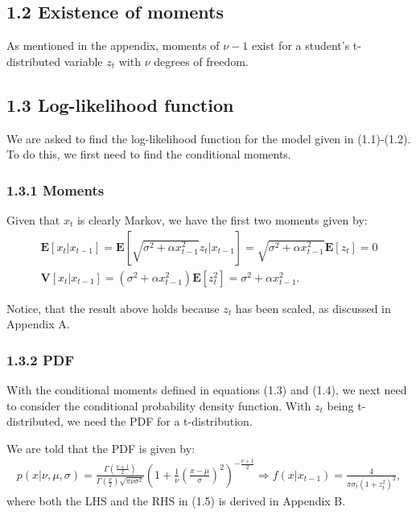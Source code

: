 \documentclass[11pt,a4paper,oneside]{article}
\newcommand{\lp}{\left(}
\newcommand{\rp}{\right)}
\newcommand{\rb}{\right]}
\newcommand{\lb}{\left[}
\newcommand{\ee}{\mathbf{E}}
\newcommand{\vv}{\mathbf{V}}
\begin{document}
\subsection{1.2 Existence of moments}
As mentioned in the appendix, moments of $\nu - 1$ exist for a student's t-distributed variable $z_t$ with $\nu$ degrees of freedom.

\subsection{1.3 Log-likelihood function}
We are asked to find the log-likelihood function for the model given in (1.1)-(1.2). To do this, we first need to find the conditional moments. 

\subsubsection{1.3.1 Moments}
Given that $x_t$ is clearly Markov, we have the first two moments given by:
\begin{gather}
    \ee\lb x_t\vert x_{t-1}\rb 
        = \ee\lb \sqrt{\sigma^2 + \alpha x_{t-1}^2} z_t\vert x_{t-1}\rb
        = \sqrt{\sigma^2 + \alpha x_{t-1}^2}\ee\lb z_t\rb = 0\\
    \vv\lb x_t\vert x_{t-1}\rb
        = \lp \sigma^2 + \alpha x_{t-1}^2\rp \ee\lb z_t^2\rb = \sigma^2 + \alpha x_{t-1}^2.
\end{gather}

Notice, that the result above holds because $z_t$ has been scaled, as discussed in Appendix A.

\subsubsection{1.3.2 PDF}
With the conditional moments defined in equations (1.3) and (1.4), we next need to consider the conditional probability density function. With $z_t$ being t-distributed, we need the PDF for a t-distribution. 

We are told that the PDF is given by:
\begin{align}
    p\lp x \vert \nu, \mu, \sigma\rp 
        = \frac{\Gamma\lp \frac{\nu + 1}{2}\rp}{\Gamma \lp \frac{\nu}{2}\rp \sqrt{\pi\nu\sigma^2}}\lp 1 + \frac{1}{\nu}\lp \frac{x - \mu}{\sigma}\rp^2\rp^{-\frac{\nu + 1}{2}}
    \Rightarrow f\lp x\vert x_{t-1}\rp 
        = \frac{4}{\pi\sigma_t\lp 1 + z_t^2\rp^2},
\end{align}
where both the LHS and the RHS in (1.5) is derived in Appendix B.
\end{document}
